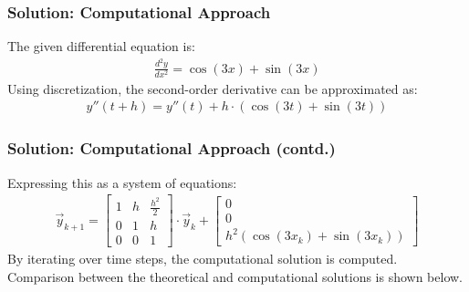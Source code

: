 \documentclass{beamer}
\begin{document}
\begin{frame}
\frametitle{Solution: Computational Approach}
The given differential equation is:
\begin{align}
    \frac{d^2y}{dx^2} = \cos(3x) + \sin(3x)
\end{align}
Using discretization, the second-order derivative can be approximated as:
\begin{align}
    y''(t+h) = y''(t) + h \cdot \left( \cos(3t) + \sin(3t) \right)
\end{align}
\end{frame}

\begin{frame}
\frametitle{Solution: Computational Approach (contd.)}
Expressing this as a system of equations:
\begin{align}
    \vec{y}_{k+1} = 
    \begin{bmatrix}
        1 & h & \frac{h^2}{2} \\
        0 & 1 & h \\
        0 & 0 & 1
    \end{bmatrix} 
    \cdot 
    \vec{y}_k + 
    \begin{bmatrix}
        0 \\
        0 \\
        h^2 \left( \cos(3x_k) + \sin(3x_k) \right)
    \end{bmatrix}
\end{align}
By iterating over time steps, the computational solution is computed.
\newline
Comparison between the theoretical and computational solutions is shown below.
\end{frame}
\end{document}
